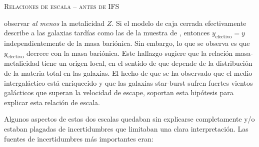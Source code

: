 \documentclass[xcolor=dvipsnames,4pt,hyperref={colorlinks,citecolor=black,linkcolor=black,urlcolor=black}]{beamer}
\begin{document}
\begin{frame}[allowframebreaks]{\textsc{Relaciones de escala -- antes de IFS}}
\begin{description}
observar \emph{al menos} la metalicidad $Z$. Si el modelo de caja cerrada efectivamente describe a
las galaxias tardías como las de la muestra de \citeauthor{Tremonti2004}, entonces
$y_\text{efectivo}=y$ independientemente de la masa bariónica. Sin embargo, lo que se observa es que
$y_\text{efectivo}$ decrece con la masa bariónica. Este hallazgo sugiere que la relación
masa-metalicidad tiene un origen local, en el sentido de que depende de la distribución de la
materia total en las galaxias. El hecho de que se ha observado que el medio intergaláctico está
enriquecido y que las galaxias star-burst sufren fuertes vientos galácticos que superan la velocidad
de escape, soportan esta hipótesis para explicar esta relación de escala.
%
\end{description}

Algunos aspectos de estas dos escalas quedaban sin explicarse completamente y/o estaban plagadas de
incertidumbres que limitaban una clara interpretación. Las fuentes de incertidumbres más importantes
eran:


\end{frame}
\end{document}
